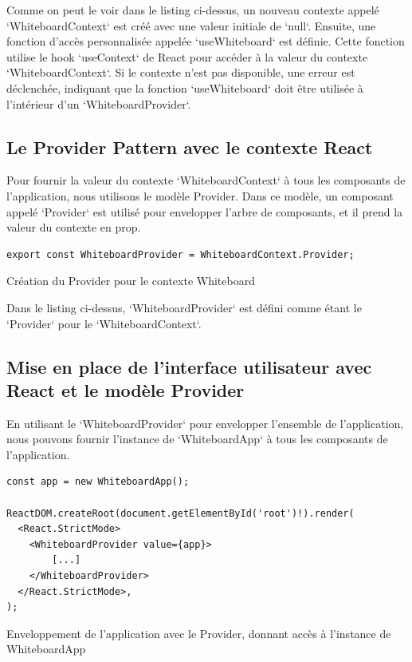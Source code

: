 Comme on peut le voir dans le listing ci-dessus, un nouveau contexte appelé `WhiteboardContext` est créé avec une valeur initiale de `null`. Ensuite, une fonction d'accès personnalisée appelée `useWhiteboard` est définie. Cette fonction utilise le hook `useContext` de React pour accéder à la valeur du contexte `WhiteboardContext`. Si le contexte n'est pas disponible, une erreur est déclenchée, indiquant que la fonction `useWhiteboard` doit être utilisée à l'intérieur d'un `WhiteboardProvider`.

\subsection{Le Provider Pattern avec le contexte React}

Pour fournir la valeur du contexte `WhiteboardContext` à tous les composants de l'application, nous utilisons le modèle Provider. Dans ce modèle, un composant appelé `Provider` est utilisé pour envelopper l'arbre de composants, et il prend la valeur du contexte en prop.

\begin{listing}[H]
    \begin{verbatim}
export const WhiteboardProvider = WhiteboardContext.Provider;
  \end{verbatim}
    \caption{Création du Provider pour le contexte Whiteboard}
\end{listing}

Dans le listing ci-dessus, `WhiteboardProvider` est défini comme étant le `Provider` pour le `WhiteboardContext`.

\subsection{Mise en place de l'interface utilisateur avec React et le modèle Provider}

En utilisant le `WhiteboardProvider` pour envelopper l'ensemble de l'application, nous pouvons fournir l'instance de `WhiteboardApp` à tous les composants de l'application.

\begin{listing}[H]
    \begin{verbatim}
const app = new WhiteboardApp();

ReactDOM.createRoot(document.getElementById('root')!).render(
  <React.StrictMode>
    <WhiteboardProvider value={app}>
        [...]
    </WhiteboardProvider>
  </React.StrictMode>,
);
  \end{verbatim}
    \caption{Enveloppement de l'application avec le Provider, donnant accès à l'instance de WhiteboardApp}
\end{listing}

